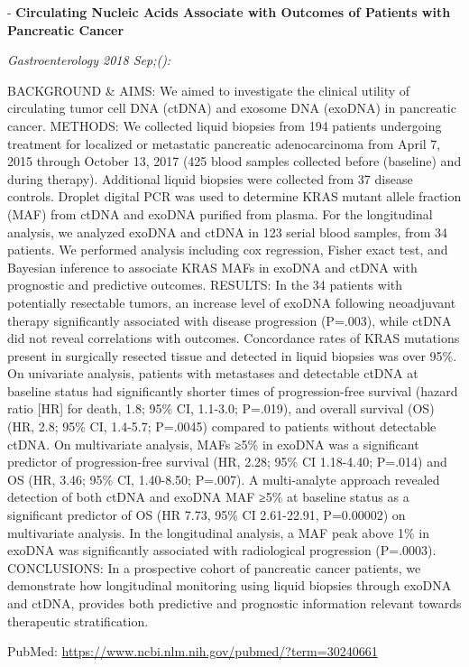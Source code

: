 \documentclass[]{article}
\begin{document}
 - \textbf{Circulating Nucleic Acids Associate with Outcomes of Patients
with Pancreatic Cancer}

\emph{Gastroenterology 2018 Sep;():}

BACKGROUND \& AIMS: We aimed to investigate the clinical utility of
circulating tumor cell DNA (ctDNA) and exosome DNA (exoDNA) in
pancreatic cancer. METHODS: We collected liquid biopsies from 194
patients undergoing treatment for localized or metastatic pancreatic
adenocarcinoma from April 7, 2015 through October 13, 2017 (425 blood
samples collected before (baseline) and during therapy). Additional
liquid biopsies were collected from 37 disease controls. Droplet digital
PCR was used to determine KRAS mutant allele fraction (MAF) from ctDNA
and exoDNA purified from plasma. For the longitudinal analysis, we
analyzed exoDNA and ctDNA in 123 serial blood samples, from 34 patients.
We performed analysis including cox regression, Fisher exact test, and
Bayesian inference to associate KRAS MAFs in exoDNA and ctDNA with
prognostic and predictive outcomes. RESULTS: In the 34 patients with
potentially resectable tumors, an increase level of exoDNA following
neoadjuvant therapy significantly associated with disease progression
(P=.003), while ctDNA did not reveal correlations with outcomes.
Concordance rates of KRAS mutations present in surgically resected
tissue and detected in liquid biopsies was over 95\%. On univariate
analysis, patients with metastases and detectable ctDNA at baseline
status had significantly shorter times of progression-free survival
(hazard ratio {[}HR{]} for death, 1.8; 95\% CI, 1.1-3.0; P=.019), and
overall survival (OS) (HR, 2.8; 95\% CI, 1.4-5.7; P=.0045) compared to
patients without detectable ctDNA. On multivariate analysis, MAFs ≥5\%
in exoDNA was a significant predictor of progression-free survival (HR,
2.28; 95\% CI 1.18-4.40; P=.014) and OS (HR, 3.46; 95\% CI, 1.40-8.50;
P=.007). A multi-analyte approach revealed detection of both ctDNA and
exoDNA MAF ≥5\% at baseline status as a significant predictor of OS (HR
7.73, 95\% CI 2.61-22.91, P=0.00002) on multivariate analysis. In the
longitudinal analysis, a MAF peak above 1\% in exoDNA was significantly
associated with radiological progression (P=.0003). CONCLUSIONS: In a
prospective cohort of pancreatic cancer patients, we demonstrate how
longitudinal monitoring using liquid biopsies through exoDNA and ctDNA,
provides both predictive and prognostic information relevant towards
therapeutic stratification.

PubMed: \url{https://www.ncbi.nlm.nih.gov/pubmed/?term=30240661}
\end{document}
